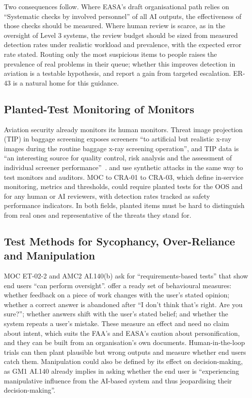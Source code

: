 \documentclass{aer}
\begin{document}
Two consequences follow. Where EASA's draft organisational path relies on ``Systematic checks by involved personnel'' of all AI outputs, the effectiveness of those checks should be measured. Where human review is scarce, as in the oversight of Level 3 systems, the review budget should be sized from measured detection rates under realistic workload and prevalence, with the expected error rate stated. Routing only the most suspicious items to people raises the prevalence of real problems in their queue; whether this improves detection in aviation is a testable hypothesis, and \citet{kale2025monitoring} report a gain from targeted escalation. ER-43 is a natural home for this guidance.

\subsection{Planted-Test Monitoring of Monitors}\label{sec:planted}

Aviation security already monitors its human monitors. Threat image projection (TIP) in baggage screening exposes screeners ``to artificial but realistic x-ray images during the routine baggage x-ray screening operation'', and TIP data is ``an interesting source for quality control, risk analysis and the assessment of individual screener performance''~\citep{hofer2005tip}. \citet{greenblatt2023control} and \citet{korbak2025sketch} use synthetic attacks in the same way to test monitors and auditors. MOC to CRA-01 to CRA-03, which define in-service monitoring, metrics and thresholds, could require planted tests for the OOS and for any human or AI reviewers, with detection rates tracked as safety performance indicators. In both fields, planted items must be hard to distinguish from real ones and representative of the threats they stand for.

\subsection{Test Methods for Sycophancy, Over-Reliance and Manipulation}\label{sec:sycophancy}

MOC ET-02-2 and AMC2 AI.140(b) ask for ``requirements-based tests'' that show end users ``can perform oversight''. \citet{sharma2023sycophancy} offer a ready set of behavioural measures: whether feedback on a piece of work changes with the user's stated opinion; whether a correct answer is abandoned after ``I don't think that's right. Are you sure?''; whether answers shift with the user's stated belief; and whether the system repeats a user's mistake. These measure an effect and need no claim about intent, which suits the FAA's and EASA's caution about personification, and they can be built from an organisation's own documents. Human-in-the-loop trials can then plant plausible but wrong outputs and measure whether end users catch them. Manipulation could also be defined by its effect on decision-making, as GM1 AI.140 already implies in asking whether the end user is ``experiencing manipulative influence from the AI-based system and thus jeopardising their decision-making''.
\end{document}
